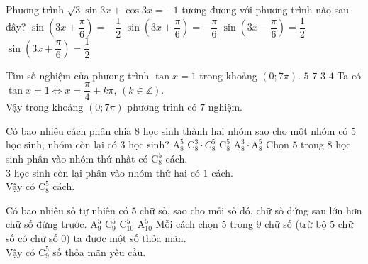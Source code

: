 \begin{ex}%
	Phương trình $\sqrt 3 \sin 3x + \cos 3x =  - 1$ tương đương với phương trình nào sau đây?
	\choice
	{\True $\sin \left( 3x + \dfrac{\pi }{6} \right) =  - \dfrac{1}{2}$}
	{$\sin \left( 3x + \dfrac{\pi }{6} \right) =  - \dfrac{\pi }{6}$}
	{$\sin \left( 3x - \dfrac{\pi }{6} \right) = \dfrac{1}{2}$}
	{$\sin \left( 3x + \dfrac{\pi }{6} \right) = \dfrac{1}{2}$}
\end{ex}
\begin{ex}%
	Tìm số nghiệm của phương trình $\tan x=1$ trong khoảng $(0;7\pi)$.
	\choice
	{$5$}
	{\True $7$}
	{$3$}
	{$4$}
	\loigiai
	{Ta có $\tan x=1\Leftrightarrow x=\dfrac{\pi }{4}+k\pi ,\,\left( k\in \mathbb{Z} \right)$.\\
		Vậy trong khoảng $\left( 0;7\pi \right)$ phương trình có $7$ nghiệm.}
\end{ex}

\begin{ex}%
	Có bao nhiêu cách phân chia $8$ học sinh thành hai nhóm sao cho một nhóm có $5$ học sinh, nhóm còn lại có $3$ học sinh?
	\choice
	{$\mathrm{A}_8^5$}
	{$\mathrm{C}_8^3\cdot C_8^5$}
	{\True $\mathrm{C}_8^5$}
	{$\mathrm{A}_8^3\cdot \mathrm{A}_8^5$}
	\loigiai
	{Chọn $5$ trong $8$ học sinh phân vào nhóm thứ nhất có $\mathrm{C}_8^5$ cách.\\
		$3$ học sinh còn lại phân vào nhóm thứ hai có $1$ cách.\\
		Vậy có $\mathrm{C}_8^5$ cách.}
\end{ex}

\begin{ex}%
	Có bao nhiêu số tự nhiên có $5$ chữ số, sao cho mỗi số đó, chữ số đứng sau lớn hơn chữ số đứng trước.
	\choice
	{$\mathrm{A}_9^5$}
	{\True $\mathrm{C}_9^5$}
	{$\mathrm{C}_{10}^5$}
	{$\mathrm{A}_{10}^5$}
	\loigiai
	{Mỗi cách chọn $5$ trong $9$ chữ số (trừ bộ $5$ chữ số có chữ số $0$) ta được một số thỏa mãn.\\
		Vậy có $\mathrm{C}_9^5$ số thỏa mãn yêu cầu.}
\end{ex}

